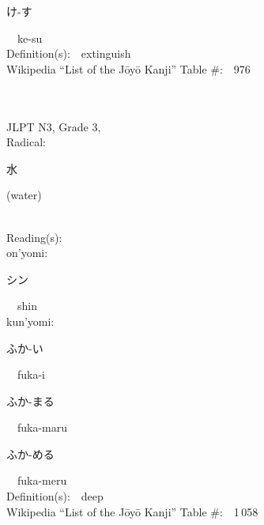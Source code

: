 \begin{multicols}{2}
{\hspace*{2em}}{\begin{CJK}{UTF8}{min} け-す \end{CJK}}\ \ ke-su\ \ \\
Definition(s):\ \ extinguish \\
Wikipedia ``List of the J\=oy\=o Kanji'' Table \#:\ \ 976 \\
\ \ \\
{\fontsize{34pt}{40pt}  }\ \ \\  %
{JLPT N3, Grade 3, \\Radical:\ \ {\begin{CJK}{UTF8}{min} 水 \end{CJK}} (water) } \\
Reading(s):\ \ \\
{\hspace*{1em}}on'yomi:\ \ \\
{\hspace*{2em}}{\begin{CJK}{UTF8}{min} シン \end{CJK}}\ \ shin\ \ \\
{\hspace*{1em}}kun'yomi:\ \ \\
{\hspace*{2em}}{\begin{CJK}{UTF8}{min} ふか-い \end{CJK}}\ \ fuka-i\ \ \\
{\hspace*{2em}}{\begin{CJK}{UTF8}{min} ふか-まる \end{CJK}}\ \ fuka-maru\ \ \\
{\hspace*{2em}}{\begin{CJK}{UTF8}{min} ふか-める \end{CJK}}\ \ fuka-meru\ \ \\
Definition(s):\ \ deep \\
Wikipedia ``List of the J\=oy\=o Kanji'' Table \#:\ \ 1\,058 \\
\ \ \\
{\fontsize{34pt}{40pt}  }\ \ \\  %

\end{multicols}
